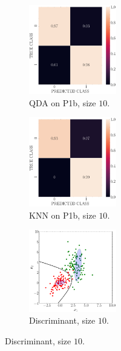 \documentclass[11pt, a4 paper]{article}
\begin{document}
\begin{figure}[!htbp]
\centering
    \begin{subfigure}[!htbp]{0.24\textwidth}
       \centering
       \includegraphics[width=1.5in]{../results/ex1/conf_mtx_QD_ML_dataset_P1b_size_10.pdf}
       \caption{QDA on P1b, size $10$.}
       \label{fig:QDA_P1b_10}
    \end{subfigure}
\quad
    \begin{subfigure}[!htbp]{0.24\textwidth}
       \centering
       \includegraphics[width=1.5in]{../results/ex1/conf_mtx_KNN_dataset_P1b_size_10.pdf}
       \caption{KNN on P1b, size $10$.}
       \label{fig:KNN_P1b_10}
    \end{subfigure}
\quad
    \begin{subfigure}[!htbp]{0.24\textwidth}
       \centering
       \includegraphics[width=1.5in]{../results/ex1/samples_QD_ML_dataset_P1b_size_10.pdf}
       \caption{Discriminant, size $10$.}
       \label{fig:KNN_P1b_10}
    \end{subfigure}
    

\end{figure}
\end{document}
